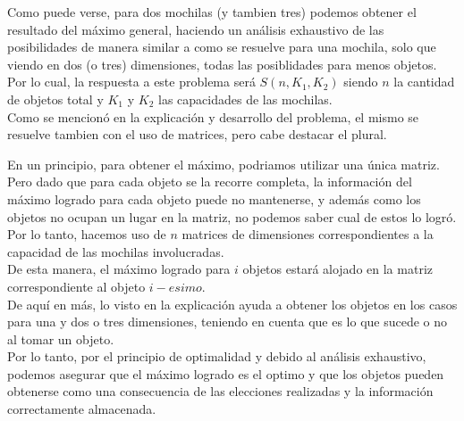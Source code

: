 Como puede verse, para dos mochilas (y tambien tres) podemos obtener el resultado del máximo general, haciendo un análisis exhaustivo de las posibilidades de manera similar a como se resuelve para una mochila, solo que viendo en dos (o tres) dimensiones, todas las posiblidades para menos objetos.\\
Por lo cual, la respuesta a este problema será $S(n, K_1, K_2)$ siendo $n$ la cantidad de objetos total y $K_1$ y $K_2$ las capacidades de las mochilas.\\

Como se mencionó en la explicación y desarrollo del problema, el mismo se resuelve tambien con el uso de matrices, pero cabe destacar el plural. 

En un principio, para obtener el máximo, podriamos utilizar una única matriz. Pero dado que para cada objeto se la recorre completa, la información del máximo logrado para cada objeto puede no mantenerse, y además como los objetos no ocupan un lugar en la matriz, no podemos saber cual de estos lo logró.\\
Por lo tanto, hacemos uso de $n$ matrices de dimensiones correspondientes a la capacidad de las mochilas involucradas. \\

De esta manera, el máximo logrado para $i$ objetos estará alojado en la matriz correspondiente al objeto $i-esimo$.\\

De aquí en más, lo visto en la explicación ayuda a obtener los objetos en los casos para una y dos o tres dimensiones, teniendo en cuenta que es lo que sucede o no al tomar un objeto. \\

Por lo tanto, por el principio de optimalidad y debido al análisis exhaustivo, podemos asegurar que el máximo logrado es el optimo y que los objetos pueden obtenerse como una consecuencia de las elecciones realizadas y la información correctamente almacenada.


